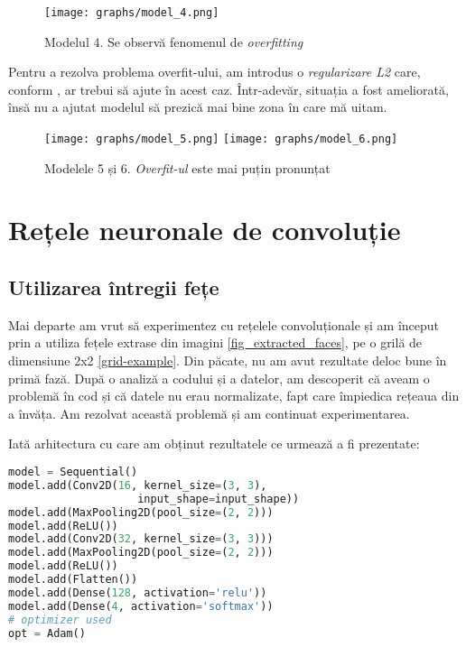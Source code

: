 \begin{figure}[h]
    \centering
    \texttt{[image: graphs/model\_4.png]}
    \caption{Modelul 4. Se observă fenomenul de \emph{overfitting}}
\end{figure}

Pentru a rezolva problema overfit-ului, am introdus o \emph{regularizare L2} care, conform \cite{l1_l2_regularisation}, ar trebui să ajute în acest caz.
Într-adevăr, situația a fost ameliorată, însă nu a ajutat modelul să prezică mai bine zona în care mă uitam.

\begin{figure}[h]
    \centering
    \texttt{[image: graphs/model\_5.png]}
    \texttt{[image: graphs/model\_6.png]}
    \caption{Modelele 5 și 6. \emph{Overfit-ul} este mai puțin pronunțat}
\end{figure}

\section{Rețele neuronale de convoluție}
\subsection{Utilizarea întregii fețe}

Mai departe am vrut să experimentez cu rețelele convoluționale și am început prin a utiliza fețele extrase din imagini \ref{fig_extracted_faces}, pe o grilă de dimensiune 2x2 \ref{grid-example}.
Din păcate, nu am avut rezultate deloc bune în primă fază.
După o analiză a codului și a datelor, am descoperit că aveam o problemă în cod și că datele nu erau normalizate, fapt care împiedica rețeaua din a învăța.
Am rezolvat această problemă și am continuat experimentarea.

Iată arhitectura cu care am obținut rezultatele ce urmează a fi prezentate:

\label{cnn_first_architecture}
\begin{lstlisting}[language=Python, caption=Prima arhitectură CNN]
model = Sequential()
model.add(Conv2D(16, kernel_size=(3, 3),
                    input_shape=input_shape))
model.add(MaxPooling2D(pool_size=(2, 2)))
model.add(ReLU())
model.add(Conv2D(32, kernel_size=(3, 3)))
model.add(MaxPooling2D(pool_size=(2, 2)))
model.add(ReLU())
model.add(Flatten())
model.add(Dense(128, activation='relu'))
model.add(Dense(4, activation='softmax'))
# optimizer used
opt = Adam()
\end{lstlisting}

